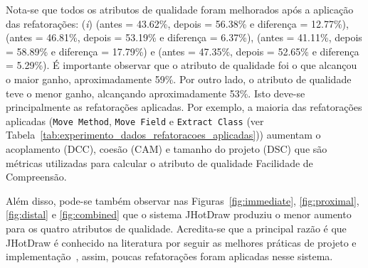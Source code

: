 Nota-se que todos os atributos de qualidade foram melhorados após a aplicação das refatorações: (\textit{i})  (antes = 43.62\%, depois = 56.38\% e diferença = 12.77\%),  (antes = 46.81\%, depois = 53.19\% e diferença = 6.37\%),  (antes = 41.11\%, depois = 58.89\% e diferença = 17.79\%) e  (antes = 47.35\%, depois = 52.65\% e diferença = 5.29\%).
É importante observar que o atributo de qualidade  foi o que alcançou o maior ganho, aproximadamente 59\%. Por outro lado, o atributo de qualidade  teve o menor ganho, alcançando aproximadamente 53\%. Isto deve-se principalmente as refatorações aplicadas. Por exemplo, a maioria das refatorações aplicadas (\texttt{Move Method}, \texttt{Move Field} e \texttt{Extract Class} (ver Tabela~\ref{tab:experimento_dados_refatoracoes_aplicadas})) aumentam o acoplamento (DCC), coesão (CAM) e tamanho do projeto (DSC) que são métricas utilizadas para calcular o atributo de qualidade Facilidade de Compreensão.

Além disso, pode-se também observar nas Figuras~\ref{fig:immediate}, \ref{fig:proximal}, \ref{fig:distal} e \ref{fig:combined} que o sistema JHotDraw produziu o menor aumento para os quatro atributos de qualidade. Acredita-se que a principal razão é que JHotDraw é conhecido na literatura por seguir as melhores práticas de projeto e implementação~\cite{Kessentini_2010}, assim, poucas refatorações foram aplicadas nesse sistema.




